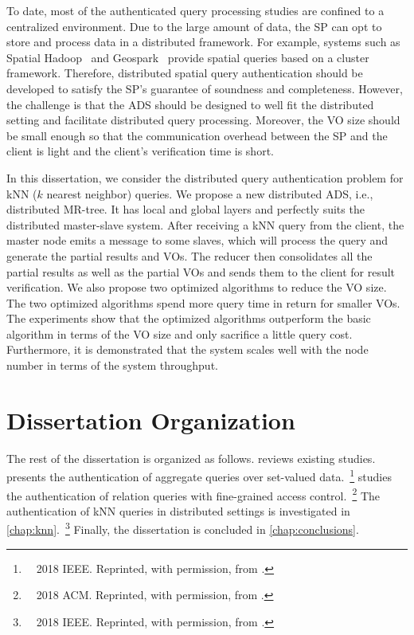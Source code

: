 To date, most of the authenticated query processing studies are confined to a centralized environment. Due to the large amount of data, the SP can opt to store and process data in a distributed framework. For example, systems such as Spatial Hadoop~\cite{10.1109/icde.2015.7113382} and Geospark~\cite{10.1145/2820783.2820860} provide spatial queries based on a cluster framework. Therefore, distributed spatial query authentication should be developed to satisfy the SP's guarantee of soundness and completeness. However, the challenge is that the ADS should be designed to well fit the distributed setting and facilitate distributed query processing. Moreover, the VO size should be small enough so that the communication overhead between the SP and the client is light and the client's verification time is short.

In this dissertation, we consider the distributed query authentication problem for kNN ($k$ nearest neighbor) queries. We propose a new distributed ADS, i.e., distributed MR-tree. It has local and global layers and perfectly suits the distributed master-slave system. After receiving a kNN query from the client, the master node emits a message to some slaves, which will process the query and generate the partial results and VOs. The reducer then consolidates all the partial results as well as the partial VOs and sends them to the client for result verification. We also propose two optimized algorithms to reduce the VO size. The two optimized algorithms spend more query time in return for smaller VOs. The experiments show that the optimized algorithms outperform the basic algorithm in terms of the VO size and only sacrifice a little query cost. Furthermore, it is demonstrated that the system scales well with the node number in terms of the system throughput.

\section{Dissertation Organization}

\begin{refsection}
  \toggletrue{bbx:doi}
  The rest of the dissertation is organized as follows.  reviews existing studies.  presents the authentication of aggregate queries over set-valued data.~\footnote{~\textcopyright~2018 IEEE. Reprinted, with permission, from .}  studies the authentication of relation queries with fine-grained access control.~\footnote{~\textcopyright~2018 ACM. Reprinted, with permission, from .} The authentication of {kNN} queries in distributed settings is investigated in \cref{chap:knn}.~\footnote{~\textcopyright~2018 IEEE. Reprinted, with permission, from .} Finally, the dissertation is concluded in \cref{chap:conclusions}.
  \togglefalse{bbx:doi}
\end{refsection}
